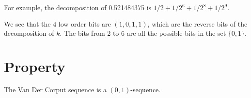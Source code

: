 For example, the decomposition of 0.521484375 is 
$1/2+1/2^6+1/2^8+1/2^9$.

We see that the 4 low order bits are $(1,0,1,1)$, 
which are the reverse bits of the decomposition of $k$. 
The bits from 2 to 6 are all the possible bits in the set $\{0,1\}$. 


\section{Property}

\begin{proposition}
\label{vdc-01net}
The Van Der Corput sequence is a $(0,1)$-sequence.
\end{proposition}

